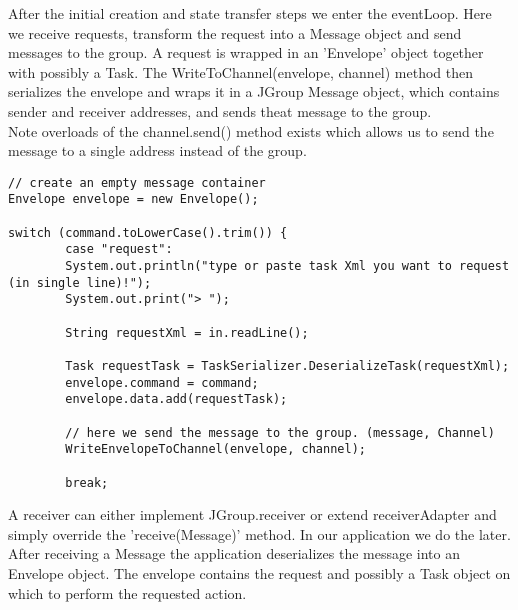 After the initial creation and state transfer steps we enter the eventLoop. Here we receive requests, transform the request 
into a Message object and send messages to the group. A request is wrapped in an 'Envelope' object together with possibly a Task.
The WriteToChannel(envelope, channel) method then serializes the envelope and wraps it in a JGroup Message object, which contains 
sender and receiver addresses, and sends theat message to the group.\\

Note overloads of the channel.send() method exists which allows us to send the message to a single address instead of the group.

\pagebreak
\begin{lstlisting}[caption=eventloop]
// create an empty message container
Envelope envelope = new Envelope();

switch (command.toLowerCase().trim()) {
        case "request":
        System.out.println("type or paste task Xml you want to request (in single line)!");
        System.out.print("> ");
            		
        String requestXml = in.readLine();

        Task requestTask = TaskSerializer.DeserializeTask(requestXml);
        envelope.command = command;
        envelope.data.add(requestTask);

        // here we send the message to the group. (message, Channel)
        WriteEnvelopeToChannel(envelope, channel);
            		
   	   	break;

\end{lstlisting}

A receiver can either implement JGroup.receiver or extend receiverAdapter and simply override the 'receive(Message)' method. 
In our application we do the later. \\

After receiving a Message the application deserializes the message into an Envelope object.
The envelope contains the request and possibly a Task object on which to perform the requested action.



